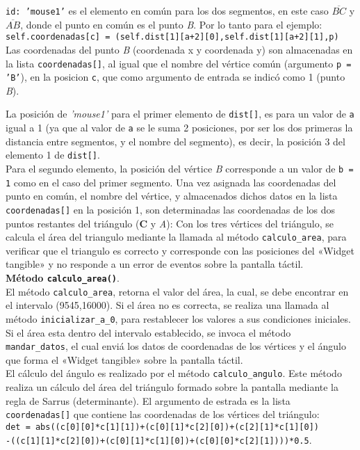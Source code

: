 \texttt{id: 'mouse1'} es el elemento en común para los dos segmentos, en este caso $\overline{BC}$ y $\overline{AB}$, donde el punto en común es el punto \textit{B}. Por lo tanto para el ejemplo:\\

\texttt{self.coordenadas[c] = (self.dist[1][a+2][0],self.dist[1][a+2][1],p)}\\

Las coordenadas del punto \textit{B} (coordenada x y coordenada y) son almacenadas en la lista \texttt{coordenadas[]}, al igual que el nombre del vértice común (argumento \texttt{p = 'B'}), en la posicion \texttt{c}, que como argumento de entrada se indicó como 1 (punto \textit{B}). 

La posición de \textit{'mouse1'} para el primer elemento de \texttt{dist[]}, es para un valor de \texttt{a} igual a 1 (ya que al valor de \texttt{a} se le suma 2 posiciones, por ser los dos primeras la distancia entre segmentos, y el nombre del segmento), es decir, la posición 3 del elemento 1 de \texttt{dist[]}.\\

Para el segundo elemento, la posición del vértice \textit{B} corresponde a un valor de \texttt{b = 1} como en el caso del primer segmento.
Una vez asignada las coordenadas del punto en común, el nombre del vértice, y almacenados dichos datos en la lista \texttt{coordenadas[]} en la posición 1, son determinadas las coordenadas de los dos puntos restantes del triángulo (\textbf{C} y \textit{A}): 
Con los tres vértices del triángulo, se calcula el área del triangulo mediante la llamada al método \texttt{calculo\_area}, para verificar que el triangulo es correcto y corresponde con las posiciones del «Widget tangible» y no responde a un error de eventos sobre la pantalla táctil.\\

\textbf{Método \texttt{calculo\_area()}}.\\
El método \texttt{calculo\_area}, retorna el valor del área, la cual, se debe encontrar en el intervalo (9545,16000). 
Si el área no es correcta, se realiza una llamada al método \texttt{inicializar\_a\_0}, para restablecer los valores a sus condiciones iniciales. 
Si el área esta dentro del intervalo establecido, se invoca el método \texttt{mandar\_datos}, el cual enviá los datos de coordenadas de los vértices y el ángulo que forma el «Widget tangible» sobre la pantalla táctil.\\ 
El cálculo del ángulo es realizado por el método \texttt{calculo\_angulo}.
Este método realiza un cálculo del área del triángulo formado sobre la pantalla mediante la regla de Sarrus (determinante).
El argumento de estrada es la lista \texttt{coordenadas[]} que contiene las coordenadas de los vértices del triángulo:\\
\texttt{det = abs((c[0][0]*c[1][1])+(c[0][1]*c[2][0])+(c[2][1]*c[1][0])}\\
\texttt{-((c[1][1]*c[2][0])+(c[0][1]*c[1][0])+(c[0][0]*c[2][1])))*0.5}.\\

